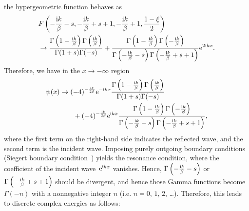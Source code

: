 the hypergeometric function behaves as
\begin{align}
    &F\left( -\frac{\mathrm{i} k}{\beta}-s, -\frac{\mathrm{i} k}{\beta}+s+1, -\frac{\mathrm{i} k}{\beta}+1, \frac{1-\xi}{2} \right) \notag\\
    &\to
    \frac{\Gamma\left(1-\frac{\mathrm{i} k}{\beta}\right) \Gamma\left(\frac{\mathrm{i} k}{\beta}\right)}{\Gamma(1+s) \Gamma(-s)}
    +
    \frac{\Gamma\left(1-\frac{\mathrm{i} k}{\beta}\right) \Gamma\left(-\frac{\mathrm{i} k}{\beta}\right)}
    {\Gamma\left(-\frac{\mathrm{i} k}{\beta}-s\right) \Gamma\left(-\frac{\mathrm{i} k}{\beta}+s+1\right)}
    \mathrm{e}^{2\mathrm{i} kx} .
\end{align}
Therefore, we have in the $x\to-\infty$ region
\begin{align}
    \psi(x) &\to
    (-4)^{-\frac{\mathrm{i} k}{2\beta}} \mathrm{e}^{-\mathrm{i} kx} 
    \frac{\Gamma\left(1-\frac{\mathrm{i} k}{\beta}\right) \Gamma\left(\frac{\mathrm{i} k}{\beta}\right)}{\Gamma(1+s) \Gamma(-s)} \notag\\&\qquad
    +
    (-4)^{-\frac{\mathrm{i} k}{2\beta}} \mathrm{e}^{\mathrm{i} kx} 
    \frac{\Gamma\left(1-\frac{\mathrm{i} k}{\beta}\right) \Gamma\left(-\frac{\mathrm{i} k}{\beta}\right)}
    {\Gamma\left(-\frac{\mathrm{i} k}{\beta}-s\right) \Gamma\left(-\frac{\mathrm{i} k}{\beta}+s+1\right)},
\end{align}
where the first term on the right-hand side indicates the reflected wave, and the second term is the incident wave.
Imposing purely outgoing boundary conditions (Siegert boundary condition~\cite{Siegert:1939}) yields the resonance condition, where the coefficient of the incident wave~$\mathrm{e}^{\mathrm{i} kx}$ vanishes.
Hence, $\Gamma\left(-\frac{\mathrm{i} k}{\beta}-s\right)$ or $\Gamma\left(-\frac{\mathrm{i} k}{\beta}+s+1\right)$ should be divergent, and hence those Gamma functions become $\Gamma(-n)$ with a nonnegative integer $n$ (i.e. $n=0$, $1$, $2$, \dots). Therefore, this leads to discrete complex energies as follows:
%
